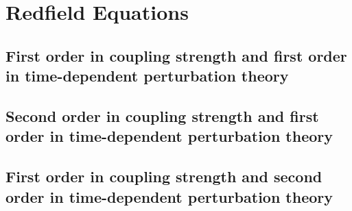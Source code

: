 \documentclass[%
 reprint,onecolumn,
 amsmath,amssymb,
aps,
]{revtex4-1}
\begin{document}
\section{Redfield Equations}

\subsection*{First order in coupling strength and first order in time-dependent perturbation theory}

\subsection*{Second order in coupling strength and first order in time-dependent perturbation theory}

\subsection*{First order in coupling strength and second order in time-dependent perturbation theory}
\end{document}
